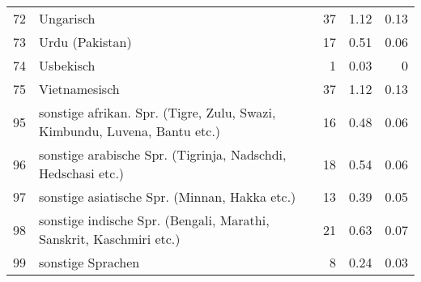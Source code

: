 \begin{longtable}{lXrrr}
        72 & \multicolumn{1}{X}{Ungarisch} & %
          \num{37} &
          \num[round-mode=places,round-precision=2]{1,12} &
          \num[round-mode=places,round-precision=2]{0,13} \\

        73 & \multicolumn{1}{X}{Urdu (Pakistan)} & %
          \num{17} &
          \num[round-mode=places,round-precision=2]{0,51} &
          \num[round-mode=places,round-precision=2]{0,06} \\

        74 & \multicolumn{1}{X}{Usbekisch} & %
          \num{1} &
          \num[round-mode=places,round-precision=2]{0,03} &
          \num[round-mode=places,round-precision=2]{0} \\

        75 & \multicolumn{1}{X}{Vietnamesisch} & %
          \num{37} &
          \num[round-mode=places,round-precision=2]{1,12} &
          \num[round-mode=places,round-precision=2]{0,13} \\

        95 & \multicolumn{1}{X}{sonstige afrikan. Spr. (Tigre, Zulu, Swazi, Kimbundu, Luvena, Bantu etc.)} & %
          \num{16} &
          \num[round-mode=places,round-precision=2]{0,48} &
          \num[round-mode=places,round-precision=2]{0,06} \\

        96 & \multicolumn{1}{X}{sonstige arabische Spr. (Tigrinja, Nadschdi, Hedschasi etc.)} & %
          \num{18} &
          \num[round-mode=places,round-precision=2]{0,54} &
          \num[round-mode=places,round-precision=2]{0,06} \\

        97 & \multicolumn{1}{X}{sonstige asiatische Spr. (Minnan, Hakka etc.)} & %
          \num{13} &
          \num[round-mode=places,round-precision=2]{0,39} &
          \num[round-mode=places,round-precision=2]{0,05} \\

        98 & \multicolumn{1}{X}{sonstige indische Spr. (Bengali, Marathi, Sanskrit, Kaschmiri etc.)} & %
          \num{21} &
          \num[round-mode=places,round-precision=2]{0,63} &
          \num[round-mode=places,round-precision=2]{0,07} \\

        99 & \multicolumn{1}{X}{sonstige Sprachen} & %
          \num{8} &
          \num[round-mode=places,round-precision=2]{0,24} &
          \num[round-mode=places,round-precision=2]{0,03} \\


\end{longtable}
